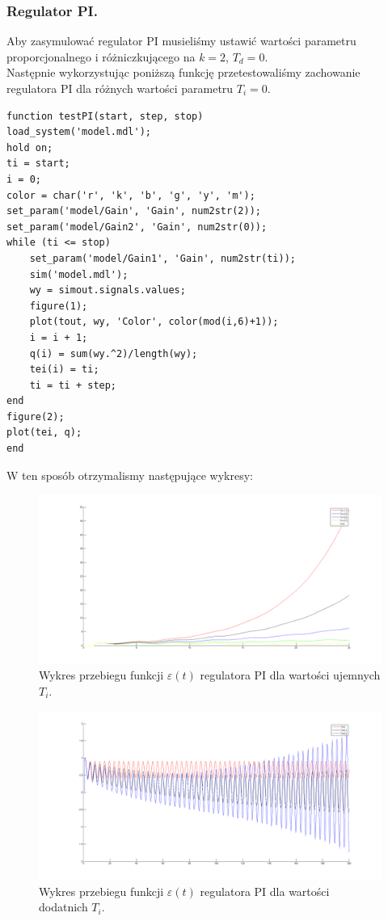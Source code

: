 \documentclass[a4paper,10pt]{article}
\begin{document}
\subsubsection{Regulator PI.}
Aby zasymulować regulator PI musieliśmy ustawić wartości parametru proporcjonalnego i różniczkującego na $k=2$, $T_{d}=0$. \\
Następnie wykorzystując poniższą funkcję przetestowaliśmy zachowanie regulatora PI dla różnych wartości parametru $T_{i}=0$. \\
\begin{lstlisting}[caption=Funkcja testująca regulator PI.]
function testPI(start, step, stop)
load_system('model.mdl');
hold on;
ti = start;
i = 0;
color = char('r', 'k', 'b', 'g', 'y', 'm');
set_param('model/Gain', 'Gain', num2str(2));
set_param('model/Gain2', 'Gain', num2str(0));
while (ti <= stop)
    set_param('model/Gain1', 'Gain', num2str(ti));
    sim('model.mdl');
    wy = simout.signals.values;
    figure(1);
    plot(tout, wy, 'Color', color(mod(i,6)+1));
    i = i + 1;
    q(i) = sum(wy.^2)/length(wy);
    tei(i) = ti;
    ti = ti + step;
end
figure(2);
plot(tei, q);
end
\end{lstlisting}
W ten sposób otrzymalismy następujące wykresy: \\
\begin{figure}[!h]
    \centering
	\includegraphics[width=140mm]{CW2-regulatorPI-eu.png}
	\caption{Wykres przebiegu funkcji $\varepsilon(t)$ regulatora PI dla wartości ujemnych $T_{i}$.}
    \label{fig:regulatorPIeu}
\end{figure}
\begin{figure}[!h]
    \centering
	\includegraphics[width=140mm]{CW2-regulatorPI-ed.png}
	\caption{Wykres przebiegu funkcji $\varepsilon(t)$ regulatora PI dla wartości dodatnich $T_{i}$.}
    \label{fig:regulatorPIed}
\end{figure}
\end{document}
